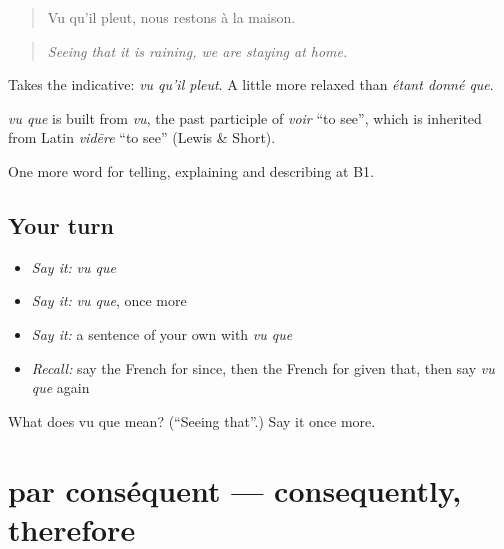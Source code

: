 \begin{quote}
Vu qu'il pleut, nous restons à la maison.
\end{quote}

\begin{quote}
\emph{Seeing that it is raining, we are staying at home.}
\end{quote}

Takes the indicative: \emph{vu qu'il pleut}. A little more relaxed than \emph{étant donné que}.

\begin{cousinweb}
\emph{vu que} is built from \emph{vu}, the past participle of \emph{voir} \textquotedblleft{}to see\textquotedblright{}, which is inherited from Latin \emph{vidēre} \textquotedblleft{}to see\textquotedblright{} (Lewis \& Short).
\end{cousinweb}

\begin{grammarlens}[title={What you've built}]
One more word for telling, explaining and describing at B1.
\end{grammarlens}

\subsection*{Your turn}
\begin{itemize}
\raggedright
  \item \emph{Say it:} \emph{vu que}
  \item \emph{Say it:} \emph{vu que}, once more
  \item \emph{Say it:} a sentence of your own with \emph{vu que}
  \item \emph{Recall:} say the French for since, then the French for given that, then say \emph{vu que} again
\end{itemize}

\begin{tcolorbox}[breakable,colback=teal!4,colframe=teal!35!black,title={Before you move on}]
What does vu que mean? (\textquotedblleft{}Seeing that\textquotedblright{}.) Say it once more.
\end{tcolorbox}
\section[par conséquent]{par conséquent — consequently, therefore}

\label{lesson:FR-C347-par-consequent}



